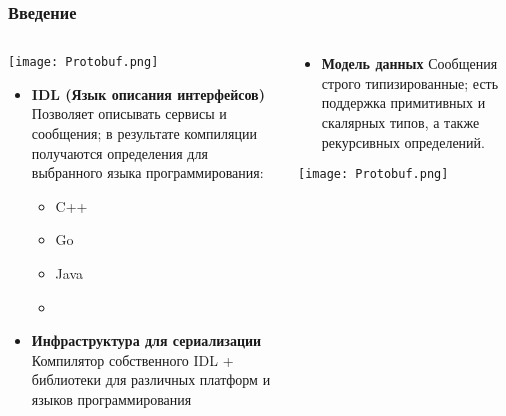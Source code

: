 \begin{frame}\frametitle{Введение}

    \begin{columns}[onlytextwidth,T]
        \begin{column}{0.5\textwidth}
            {
                \texttt{[image: Protobuf.png]}
            }
            {
                {
                    \begin{itemize}
                        \item \textbf{IDL (Язык описания интерфейсов)}
                            Позволяет описывать сервисы и сообщения; в результате компиляции получаются определения для
                            выбранного языка программирования:

                            \begin{itemize}
                                \item C++
                                \item Go
                                \item Java
                                \item {}
                            \end{itemize}
                    \end{itemize}
                }
                {
                    \begin{itemize}
                        \item \textbf{Инфраструктура для сериализации}
                            Компилятор собственного IDL + библиотеки для различных платформ и языков программирования
                    \end{itemize}
                }
            }
        \end{column}

        \pause
        \begin{column}{0.5\textwidth}
            {
                \begin{itemize}
                    \item \textbf{Модель данных}
                        Сообщения строго типизированные; есть поддержка примитивных и скалярных типов, а также рекурсивных
                        определений.
                \end{itemize}
            }
            {
                \texttt{[image: Protobuf.png]}
            }
        \end{column}
    \end{columns}
\end{frame}

